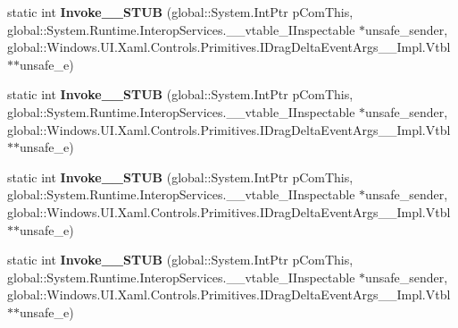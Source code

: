 \begin{DoxyCompactItemize}
\item 
\mbox{\label{struct_windows_1_1_u_i_1_1_xaml_1_1_controls_1_1_primitives_1_1_drag_delta_event_handler_____impl_1_1_vtbl_a76c8d2fb3c89d7ee2fce021774b302e4}} 
static int {\bfseries Invoke\+\_\+\+\_\+\+S\+T\+UB} (global\+::\+System.\+Int\+Ptr p\+Com\+This, global\+::\+System.\+Runtime.\+Interop\+Services.\+\_\+\+\_\+vtable\+\_\+\+I\+Inspectable $\ast$unsafe\+\_\+sender, global\+::\+Windows.\+U\+I.\+Xaml.\+Controls.\+Primitives.\+I\+Drag\+Delta\+Event\+Args\+\_\+\+\_\+\+Impl.\+Vtbl $\ast$$\ast$unsafe\+\_\+e)
\item 
\mbox{\label{struct_windows_1_1_u_i_1_1_xaml_1_1_controls_1_1_primitives_1_1_drag_delta_event_handler_____impl_1_1_vtbl_a76c8d2fb3c89d7ee2fce021774b302e4}} 
static int {\bfseries Invoke\+\_\+\+\_\+\+S\+T\+UB} (global\+::\+System.\+Int\+Ptr p\+Com\+This, global\+::\+System.\+Runtime.\+Interop\+Services.\+\_\+\+\_\+vtable\+\_\+\+I\+Inspectable $\ast$unsafe\+\_\+sender, global\+::\+Windows.\+U\+I.\+Xaml.\+Controls.\+Primitives.\+I\+Drag\+Delta\+Event\+Args\+\_\+\+\_\+\+Impl.\+Vtbl $\ast$$\ast$unsafe\+\_\+e)
\item 
\mbox{\label{struct_windows_1_1_u_i_1_1_xaml_1_1_controls_1_1_primitives_1_1_drag_delta_event_handler_____impl_1_1_vtbl_a76c8d2fb3c89d7ee2fce021774b302e4}} 
static int {\bfseries Invoke\+\_\+\+\_\+\+S\+T\+UB} (global\+::\+System.\+Int\+Ptr p\+Com\+This, global\+::\+System.\+Runtime.\+Interop\+Services.\+\_\+\+\_\+vtable\+\_\+\+I\+Inspectable $\ast$unsafe\+\_\+sender, global\+::\+Windows.\+U\+I.\+Xaml.\+Controls.\+Primitives.\+I\+Drag\+Delta\+Event\+Args\+\_\+\+\_\+\+Impl.\+Vtbl $\ast$$\ast$unsafe\+\_\+e)
\item 
\mbox{\label{struct_windows_1_1_u_i_1_1_xaml_1_1_controls_1_1_primitives_1_1_drag_delta_event_handler_____impl_1_1_vtbl_a76c8d2fb3c89d7ee2fce021774b302e4}} 
static int {\bfseries Invoke\+\_\+\+\_\+\+S\+T\+UB} (global\+::\+System.\+Int\+Ptr p\+Com\+This, global\+::\+System.\+Runtime.\+Interop\+Services.\+\_\+\+\_\+vtable\+\_\+\+I\+Inspectable $\ast$unsafe\+\_\+sender, global\+::\+Windows.\+U\+I.\+Xaml.\+Controls.\+Primitives.\+I\+Drag\+Delta\+Event\+Args\+\_\+\+\_\+\+Impl.\+Vtbl $\ast$$\ast$unsafe\+\_\+e)

\end{DoxyCompactItemize}
